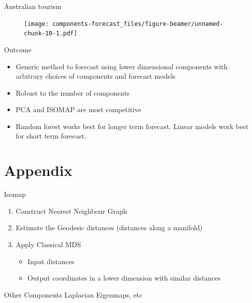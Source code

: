 \documentclass[14pt,ignorenonframetext,]{beamer}
\providecommand{\tightlist}{%
  \setlength{\itemsep}{0pt}\setlength{\parskip}{0pt}}
\begin{document}
\begin{frame}{Australian tourism}
\protect\hypertarget{australian-tourism}{}
\begin{figure}

{\centering \texttt{[image: components-forecast\_files/figure-beamer/unnamed-chunk-10-1.pdf]}

}

\end{figure}
\end{frame}

\begin{frame}{Outcome}
\protect\hypertarget{outcome}{}
\begin{itemize}
\item
  Generic method to forecast using lower dimensional components with
  arbitrary choices of components and forecast models
\item
  Robust to the number of components
\item
  PCA and ISOMAP are most competitive
\item
  Random forest works best for longer term forecast. Linear models work
  best for short term forecast.
\end{itemize}
\end{frame}

\hypertarget{appendix}{%
\section{Appendix}\label{appendix}}

\begin{frame}{Isomap}
\protect\hypertarget{isomap}{}
\begin{enumerate}
\tightlist
\item
  Construct Nearest Neighbour Graph
\item
  Estimate the Geodesic distances (distances along a manifold)
\item
  Apply Classical MDS

  \begin{itemize}
  \tightlist
  \item
    Input distances
  \item
    Output coordinates in a lower dimension with similar distances
  \end{itemize}
\end{enumerate}

\begin{block}{Other Components}
\protect\hypertarget{other-components}{}
Laplacian Eigenmaps, etc
\end{block}
\end{frame}
\end{document}
